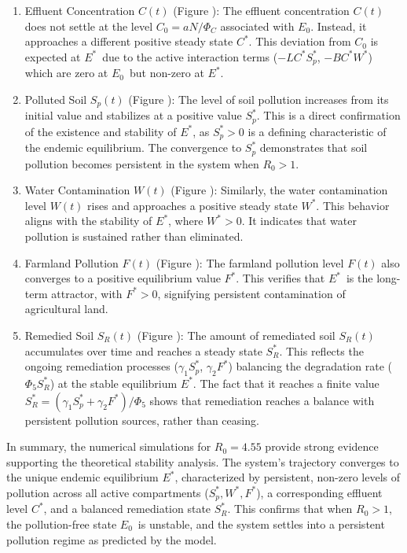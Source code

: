 \documentclass[10pt]{NSP1}
\begin{document}
\begin{enumerate}
  \item Effluent Concentration \(C(t)\) (Figure ): The effluent concentration \(C(t)\) does not settle at the level \(C_{0} = aN/\Phi_{C}\) associated with \(E_{0}\). Instead, it approaches a different positive steady state \(C^{*}\). This deviation from \(C_{0}\) is expected at \(E^{*}\) due to the active interaction terms (\(- LC^{*}S_{p}^{*}\), \(- BC^{*}W^{*}\)) which are zero at \(E_{0}\) but non-zero at \(E^{*}\).
  \item Polluted Soil \(S_{p}(t)\) (Figure ): The level of soil pollution increases from its initial value and stabilizes at a positive value \(S_{p}^{*}\). This is a direct confirmation of the existence and stability of \(E^{*}\), as \(S_{p}^{*} > 0\) is a defining characteristic of the endemic equilibrium. The convergence to \(S_{p}^{*}\) demonstrates that soil pollution becomes persistent in the system when \(R_{0} > 1\).
  \item Water Contamination \(W(t)\) (Figure ): Similarly, the water contamination level \(W(t)\) rises and approaches a positive steady state \(W^{*}\). This behavior aligns with the stability of \(E^{*}\), where \(W^{*} > 0\). It indicates that water pollution is sustained rather than eliminated.
  \item Farmland Pollution \(F(t)\) (Figure ): The farmland pollution level \(F(t)\) also converges to a positive equilibrium value \(F^{*}\). This verifies that \(E^{*}\) is the long-term attractor, with \(F^{*} > 0\), signifying persistent contamination of agricultural land.
  \item Remedied Soil \(S_{R}(t)\) (Figure ): The amount of remediated soil \(S_{R}(t)\) accumulates over time and reaches a steady state \(S_{R}^{*}\). This reflects the ongoing remediation processes (\(\gamma_{1}S_{p}^{*}\), \(\gamma_{2}F^{*}\)) balancing the degradation rate (\(\Phi_{5}S_{R}^{*}\)) at the stable equilibrium \(E^{*}\). The fact that it reaches a finite value \(S_{R}^{*} = \left( \gamma_{1}S_{p}^{*} + \gamma_{2}F^{*} \right)/\Phi_{5}\) shows that remediation reaches a balance with persistent pollution sources, rather than ceasing.
\end{enumerate}

In summary, the numerical simulations for \(R_{0} = 4.55\) provide strong evidence supporting the theoretical stability analysis. The system’s trajectory converges to the unique endemic equilibrium \(E^{*}\), characterized by persistent, non-zero levels of pollution across all active compartments (\(S_{p}^{*},W^{*},F^{*}\)), a corresponding effluent level \(C^{*}\), and a balanced remediation state \(S_{R}^{*}\). This confirms that when \(R_{0} > 1\), the pollution-free state \(E_{0}\) is unstable, and the system settles into a persistent pollution regime as predicted by the model.
\end{document}
